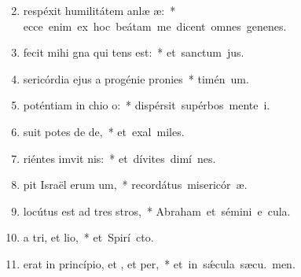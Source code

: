 \begin{flushleft}
\begin{enumerate}[leftmargin=*]
\setcounter{enumi}{1}

\item {} respéxit humilitátem anlæ æ:~* \mbox{ecce enim ex hoc beátam me dicent omnes genenes.}
\item {} fecit mihi gna qui tens est:~* \mbox{et sanctum  jus.}
\item {}sericórdia ejus a progénie  pronies~* \mbox{timén um.}
\item {} poténtiam in chio o:~* \mbox{dispérsit supérbos mente  i.}
\item {}suit potes de de,~* \mbox{et exal miles.}
\item {}riéntes imvit nis:~* \mbox{et dívites dimí nes.}
\item {}pit Israël erum um,~* \mbox{recordátus misericór æ.}
\item {} locútus est ad tres stros,~* \mbox{Abraham et sémini e  cula.}
\item {}a tri, et lio,~* \mbox{et Spirí cto.}
\item {} erat in princípio, et , et per,~* \mbox{et in s\'{\ae}cula sæcu. men.}


\end{enumerate}
\end{flushleft}


